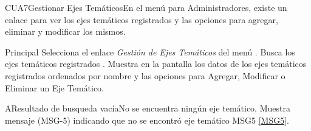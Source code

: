 
	\begin{UseCase}{CUA7}{Gestionar Ejes Temáticos}{En el menú para Administradores, existe un enlace para ver los ejes temáticos registrados y las opciones para agregar, eliminar y modificar los mismos.}
	\end{UseCase}
	

	\begin{UCtrayectoria}{Principal}
		\UCpaso[\UCactor] Selecciona el enlace \textit{Gestión de Ejes Temáticos} del menú .
		\UCpaso Busca los ejes temáticos registrados \label{paso:CUA7buscarEjesTematicos}. 
		\UCpaso Muestra en la pantalla  los datos de los ejes temáticos  registrados ordenados por nombre y las opciones para Agregar, Modificar o Eliminar un Eje Temático.  
	\end{UCtrayectoria}

	\begin{UCtrayectoriaA}{A}{Resultado de busqueda vacía}{No se encuentra ningún eje temático.}
			\UCpaso Muestra mensaje (MSG-5) indicando que no se encontró eje temático MSG5 \ref{MSG5}.
	\end{UCtrayectoriaA}

